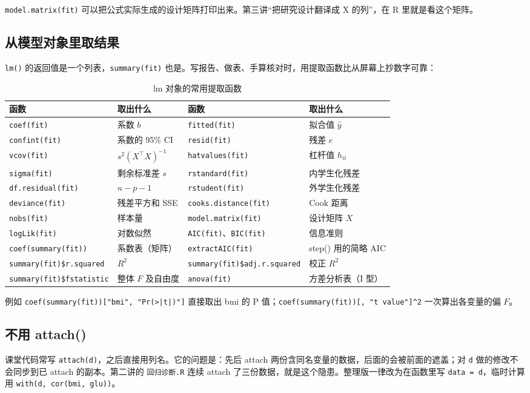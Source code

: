 \Verb|model.matrix(fit)| 可以把公式实际生成的设计矩阵打印出来。第三讲“把研究设计翻译成 X 的列”，在 R 里就是看这个矩阵。

\subsection{从模型对象里取结果}
\Verb|lm()| 的返回值是一个列表，\Verb|summary(fit)| 也是。写报告、做表、手算核对时，用提取函数比从屏幕上抄数字可靠：

\begin{table}[htbp]
\centering\footnotesize
\caption{lm 对象的常用提取函数}
\label{tab:extract}
\begin{tabular}{@{}ll@{\qquad}ll@{}}
\toprule
函数 & 取出什么 & 函数 & 取出什么\\
\midrule
\Verb|coef(fit)| & 系数 $b$ & \Verb|fitted(fit)| & 拟合值 $\hat y$\\
\Verb|confint(fit)| & 系数的 95\% CI & \Verb|resid(fit)| & 残差 $e$\\
\Verb|vcov(fit)| & $s^2(X^\top X)^{-1}$ & \Verb|hatvalues(fit)| & 杠杆值 $h_{ii}$\\
\Verb|sigma(fit)| & 剩余标准差 $s$ & \Verb|rstandard(fit)| & 内学生化残差\\
\Verb|df.residual(fit)| & $n-p-1$ & \Verb|rstudent(fit)| & 外学生化残差\\
\Verb|deviance(fit)| & 残差平方和 SSE & \Verb|cooks.distance(fit)| & Cook 距离\\
\Verb|nobs(fit)| & 样本量 & \Verb|model.matrix(fit)| & 设计矩阵 $X$\\
\Verb|logLik(fit)| & 对数似然 & \Verb|AIC(fit)|、\Verb|BIC(fit)| & 信息准则\\
\Verb|coef(summary(fit))| & 系数表（矩阵） & \Verb|extractAIC(fit)| & step() 用的简略 AIC\\
\Verb|summary(fit)$r.squared| & $R^2$ & \Verb|summary(fit)$adj.r.squared| & 校正 $R^2$\\
\Verb|summary(fit)$fstatistic| & 整体 $F$ 及自由度 & \Verb|anova(fit)| & 方差分析表（I 型）\\
\bottomrule
\end{tabular}
\end{table}

例如 \Verb!coef(summary(fit))["bmi", "Pr(>|t|)"]! 直接取出 bmi 的 P 值；\Verb|coef(summary(fit))[, "t value"]^2| 一次算出各变量的偏 $F$。

\subsection{不用 attach()}
课堂代码常写 \Verb|attach(d)|，之后直接用列名。它的问题是：先后 attach 两份含同名变量的数据，后面的会被前面的遮盖；对 \Verb|d| 做的修改不会同步到已 attach 的副本。第二讲的 \Verb|回归诊断.R| 连续 attach 了三份数据，就是这个隐患。整理版一律改为在函数里写 \Verb|data = d|，临时计算用 \Verb|with(d, cor(bmi, glu))|。

